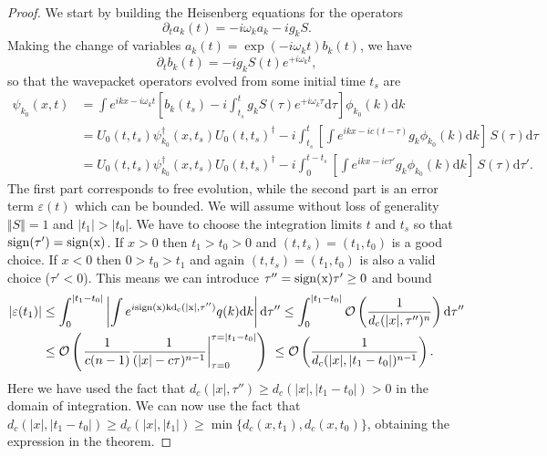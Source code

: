 \documentclass[notitlepage, prx, preprint, amsmath,superscriptaddress,amssymb]{revtex4-1}
\begin{document}
\begin{proof}
We start by building the Heisenberg equations for the operators
\begin{equation}
\partial_t a_k(t) = -i\omega_k a_k - i g_k S.
\end{equation}
Making the change of variables $a_k(t) = \exp(-i\omega_k t)b_k(t)$, we have
\begin{equation}
\partial_t b_k(t) = -ig_k S(t) e^{+i\omega_k t},
\end{equation}
so that the wavepacket operators evolved from some initial time $t_{s}$ are
\begin{align}
\psi_{k_0}(x,t) &= \int e^{ik x - i \omega_k t} \left[b_k(t_s)
-i\int_{t_{s}}^t g_k S(\tau)e^{+i\omega_k \tau}\mathrm{d}\tau\right]\phi_{k_0}(k)\mathrm{d}k\\
&=U_0(t,t_s)\psi^{\dagger}_{k_0}(x,t_s)U_0(t,t_s)^\dagger - 
i\int_{t_{s}}^t \left[\int e^{ikx-ic(t-\tau)}g_k\phi_{k_0}(k)\mathrm{d}k
\right]\,S(\tau)\mathrm{d}\tau\\
&=U_0(t,t_s)\psi^{\dagger}_{k_0}(x,t_s)U_0(t,t_s)^\dagger- 
i\int_{0}^{t-t_s} \left[\int e^{ikx-ic\tau'}g_k\phi_{k_0}(k)\mathrm{d}k
\right]\,S(\tau)\mathrm{d}\tau'.
\end{align}
The first part corresponds to free evolution, while the second part is an error term $\varepsilon(t)$ which can be bounded. We will assume without loss of generality $\Vert{S}\Vert=1$ and $|t_1|>|t_0|$. We have to choose the integration limits $t$ and $t_s$ so that $\rm{sign}(\tau')=\rm{sign}(x)$. If $x>0$ then $t_1>t_0>0$ and $(t,t_s)=(t_1,t_0)$ is a good choice. If $x<0$ then $0>t_0>t_1$ and again $(t,t_s)=(t_1,t_0)$ is also a valid choice ($\tau'<0$). This means we can introduce $\tau''=\rm{sign}(x)\tau'\geq 0$ and bound
\begin{align}
|\varepsilon(t_1)|
&\leq \int_{0}^{|t_1-t_0|} \left|\int e^{i\rm{sign}(x)kd_c(|x|,\tau'')}q(k)\mathrm{d}k\right|\mathrm{d}\tau''
\leq \int_{0}^{|t_1-t_0|} \mathcal{O}\left(\frac{1}{d_c(|x|,\tau'')^{n}}\right)\mathrm{d}\tau''\\
&\leq \mathcal{O}\left(
\left. \frac{1}{c(n-1)} \frac{1}{(|x|-c\tau)^{n-1}}\right|_{\tau=0}^{\tau=|t_1-t_0|}\right)\
\leq \mathcal{O}\left(\frac{1}{d_c(|x|,|t_1-t_0|)^{n-1}}\right).
\end{align}
Here we have used the fact that $d_c(|x|,\tau'')\geq d_c(|x|,|t_1-t_0|)> 0$ in the domain of integration. We can now use the fact that $d_c(|x|,|t_1-t_0|)\geq d_c(|x|,|t_1|)\geq \min\{d_c(x,t_1),d_c(x,t_0)\}$, obtaining the expression in the theorem.
\end{proof}
\end{document}
